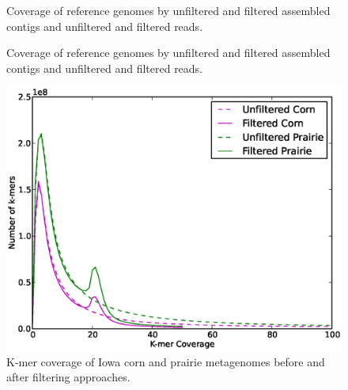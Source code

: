 \documentclass{pnastwo}
\begin{document}
\begin{figure}
\caption{Coverage of reference genomes by unfiltered and filtered
  assembled contigs and unfiltered and filtered reads.}
\label{coverage1}
\end{figure}

\begin{figure}
\caption{Coverage of reference genomes by unfiltered and filtered
  assembled contigs and unfiltered and filtered reads.}
\label{coverage2}
\end{figure}

\begin{figure}
\begin{center}
\centerline{\includegraphics[width=.7\textwidth]{./figures/fig2-diginormhist.eps}}
\caption{K-mer coverage of Iowa corn and prairie metagenomes before
  and after filtering approaches.}
\label{diginormcoverage}
\end{center}
\end{figure}
\end{document}
